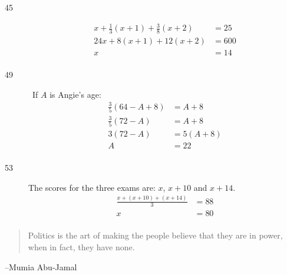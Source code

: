 \documentclass[letterpaper]{exam}
\begin{document}
\begin{description}

      \item[45]
        \begin{align*}
          x + \frac{1}{3} (x + 1) + \frac{3}{8} (x + 2)            & = 25 \\
          24x + 8(x + 1) + 12(x + 2)                               & = 600 \\
          x                                                        & = \boxed{ 14 } \\
        \end{align*}

      \item[49] \ 
      If $A$ is Angie's age:
      \begin{align*}
        \frac{3}{5}(64 - A + 8)       & = A + 8 \\
        \frac{3}{5} (72 - A)          & = A + 8 \\
        3(72 - A)                     & = 5(A + 8) \\
        A                             & = 22 \\
      \end{align*}
      
      \item[53] 
        The scores for the three exams are: $x$, $x + 10$ and $x + 14$.
        \begin{align*}
          \frac{ x + (x + 10) + (x + 14) }{3} & = 88 \\
          x                                   & = 80 \\
        \end{align*}
    \end{description}

  \fi

  \ifprintanswers{}
  \else
    \vspace{10 cm}
    \begin{quote}
      \begin{em}
        Politics is the art of making the people believe that they are in
        power, when in fact, they have none.        
      \end{em}
    \end{quote}
    \hspace{1 cm} --Mumia Abu-Jamal
  \fi
\end{document}
